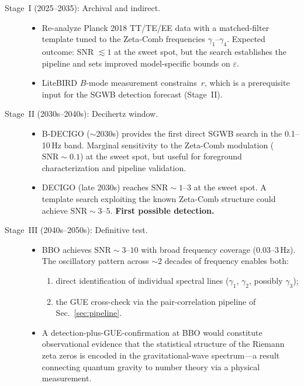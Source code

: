 \documentclass[12pt,a4paper]{article}
\begin{document}
\begin{description}
\item[Stage~I (2025--2035): Archival and indirect.]
  \begin{itemize}
  \item Re-analyze Planck 2018 TT/TE/EE data with a
    matched-filter template tuned to the Zeta-Comb
    frequencies $\gamma_1$--$\gamma_4$.  Expected
    outcome: SNR $\lesssim 1$ at the sweet spot, but
    the search establishes the pipeline and sets
    improved model-specific bounds on $\varepsilon$.
  \item LiteBIRD $B$-mode measurement constrains~$r$,
    which is a prerequisite input for the SGWB
    detection forecast (Stage~II).
  \end{itemize}

\item[Stage~II (2030s--2040s): Decihertz window.]
  \begin{itemize}
  \item B-DECIGO ($\sim$2030s) provides the first
    direct SGWB search in the 0.1--10\,Hz band.
    Marginal sensitivity to the Zeta-Comb modulation
    ($\mathrm{SNR}\sim 0.1$) at the sweet spot,
    but useful for foreground characterization and
    pipeline validation.
  \item DECIGO (late 2030s) reaches
    $\mathrm{SNR}\sim 1$--$3$ at the sweet spot.
    A template search exploiting the known Zeta-Comb
    structure could achieve $\mathrm{SNR}\sim 3$--$5$.
    \textbf{First possible detection.}
  \end{itemize}

\item[Stage~III (2040s--2050s): Definitive test.]
  \begin{itemize}
  \item BBO achieves $\mathrm{SNR}\sim 3$--$10$ with
    broad frequency coverage (0.03--3\,Hz).
    The oscillatory pattern across $\sim\!2$ decades
    of frequency enables both:
    \begin{enumerate}
    \item direct identification of individual spectral
      lines ($\gamma_1$, $\gamma_2$, possibly
      $\gamma_3$);
    \item the GUE cross-check via the pair-correlation
      pipeline of Sec.~\ref{sec:pipeline}.
    \end{enumerate}
  \item A detection-plus-GUE-confirmation at BBO would
    constitute observational evidence that the
    statistical structure of the Riemann zeta zeros
    is encoded in the gravitational-wave spectrum---a
    result connecting quantum gravity to number
    theory via a physical measurement.
  \end{itemize}
\end{description}
\end{document}
